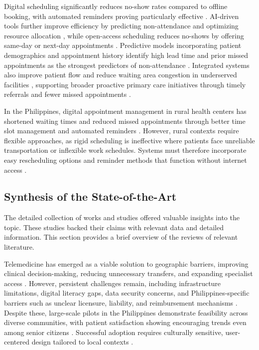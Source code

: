 \documentclass{research}
\begin{document}
Digital scheduling significantly reduces no-show rates compared to offline booking, with automated
reminders proving particularly effective \cite{Betancor2024}. AI-driven tools further improve
efficiency by predicting non-attendance and optimizing resource allocation \cite{Kucuk2024}, while
open-access scheduling reduces no-shows by offering same-day or next-day appointments
\cite{Mazaheri2024}. Predictive models incorporating patient demographics and appointment history
identify high lead time and prior missed appointments as the strongest predictors of non-attendance
\cite{Ferro2020,Dantas2018}. Integrated systems also improve patient flow and reduce waiting area
congestion in underserved facilities \cite{Wang2023}, supporting broader proactive primary care
initiatives through timely referrals and fewer missed appointments \cite{Cusack2020,Patel2023}.

In the Philippines, digital appointment management in rural health centers has shortened waiting
times and reduced missed appointments through better time slot management and automated reminders
\cite{DelRosario2024}. However, rural contexts require flexible approaches, as rigid scheduling is
ineffective where patients face unreliable transportation or inflexible work schedules. Systems
must therefore incorporate easy rescheduling options and reminder methods that function without
internet access \cite{Ramirez2021}.

\subsection*{Synthesis of the State-of-the-Art}

The detailed collection of works and studies offered valuable insights into the topic. These studies
backed their claims with relevant data and detailed information. This section provides a brief
overview of the reviews of relevant literature.

Telemedicine has emerged as a viable solution to geographic barriers, improving clinical
decision-making, reducing unnecessary transfers, and expanding specialist access
\cite{Ezeamii2024,Natafgi2021,McCormick2021}. However, persistent challenges remain, including
infrastructure limitations, digital literacy gaps, data security concerns, and Philippines-specific
barriers such as unclear licensure, liability, and reimbursement mechanisms
\cite{Macariola2021,Smith2021,Castillo2023,Domingo2023}. Despite these, large-scale pilots in the
Philippines demonstrate feasibility across diverse communities, with patient satisfaction showing
encouraging trends even among senior citizens \cite{Aquino2022,Noceda2023,Salazar2021,Pickering2024}.
Successful adoption requires culturally sensitive, user-centered design tailored to local contexts
\cite{Cruz2022,Tiu2022}.
\end{document}
